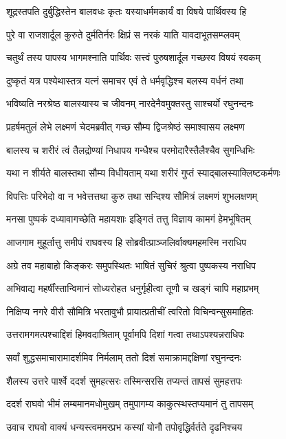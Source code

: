 \twolineshloka
{शूद्रस्तपति दुर्बुद्धिस्तेन बालवधः कृतः}
{यस्याधर्ममकार्यं वा विषये पार्थिवस्य हि}%

\twolineshloka
{पुरे वा राजशार्दूल कुरुते दुर्मतिर्नरः}
{क्षिप्रं स नरकं याति यावदाभूतसम्प्लवम्}%

\twolineshloka
{चतुर्थं तस्य पापस्य भागमश्नाति पार्थिवः}
{सत्त्वं पुरुषशार्दूल गच्छस्व विषयं स्वकम्}%

\twolineshloka
{दुष्कृतं यत्र पश्येथास्तत्र यत्नं समाचर}
{एवं ते धर्मवृद्धिश्च बलस्य वर्धनं तथा}%

\twolineshloka
{भविष्यति नरश्रेष्ठ बालस्यास्य च जीवनम्}
{नारदेनैवमुक्तस्तु साश्चर्यो रघुनन्दनः}%

\twolineshloka
{प्रहर्षमतुलं लेभे लक्ष्मणं चेदमब्रवीत्}
{गच्छ सौम्य द्विजश्रेष्ठं समाश्वासय लक्ष्मण}%

\twolineshloka
{बालस्य च शरीरं त्वं तैलद्रोण्यां निधापय}
{गन्धैश्च परमोदारैस्तैलैश्चैव सुगन्धिभिः}%

\twolineshloka
{यथा न शीर्यते बालस्तथा सौम्य विधीयताम्}
{यथा शरीरं गुप्तं स्याद्बालस्याक्लिष्टकर्मणः}%

\twolineshloka
{विपत्तिः परिभेदो वा न भवेत्तत्तथा कुरु}
{तथा सन्दिश्य सौमित्रं लक्ष्मणं शुभलक्षणम्}%

\twolineshloka
{मनसा पुष्पकं दध्यावागच्छेति महायशाः}
{इङ्गितं तत्तु विज्ञाय कामगं हेमभूषितम्}%

\twolineshloka
{आजगाम मुहूर्तात्तु समीपं राघवस्य हि}
{सोब्रवीत्प्राञ्जलिर्वाक्यमहमस्मि नराधिप}%

\twolineshloka
{अग्रे तव महाबाहो किङ्करः समुपस्थितः}
{भाषितं सुचिरं श्रुत्वा पुष्पकस्य नराधिप}%

\twolineshloka
{अभिवाद्य महर्षींस्तान्विमानं सोध्यरोहत}
{धनुर्गृहीत्वा तूणौ च खड्गं चापि महाप्रभम्}%

\twolineshloka
{निक्षिप्य नगरे वीरौ सौमित्रि भरतावुभौ}
{प्रायात्प्रतीचीं त्वरितो विचिन्वन्सुसमाहितः}%

\twolineshloka
{उत्तरामगमत्पश्चाद्दिशं हिमवदाश्रिताम्}
{पूर्वामपि दिशां गत्वा तथाऽपश्यन्नराधिपः}%

\twolineshloka
{सर्वां शुद्धसमाचारामादर्शमिव निर्मलाम्}
{ततो दिशं समाक्रामद्दक्षिणां रघुनन्दनः}%

\twolineshloka
{शैलस्य उत्तरे पार्श्वे ददर्श सुमहत्सरः}
{तस्मिन्सरसि तप्यन्तं तापसं सुमहत्तपः}%

\twolineshloka
{ददर्श राघवो भीमं लम्बमानमधोमुखम्}
{तमुपागम्य काकुत्स्थस्तप्यमानं तु तापसम्}%

\twolineshloka
{उवाच राघवो वाक्यं धन्यस्त्वममरप्रभ}
{कस्यां योनौ तपोवृद्धिर्वर्तते दृढनिश्चय}%

